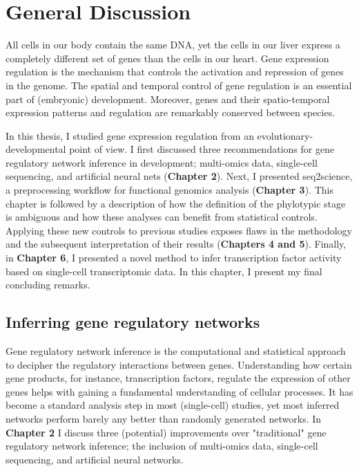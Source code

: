 \chapter{General Discussion}\thumbforchapter
\newpage

\noindent
All cells in our body contain the same DNA, yet the cells in our liver express a completely different set of genes than the cells in our heart. Gene expression regulation is the mechanism that controls the activation and repression of genes in the genome. The spatial and temporal control of gene regulation is an essential part of (embryonic) development. Moreover, genes and their spatio-temporal expression patterns and regulation are remarkably conserved between species.

In this thesis, I studied gene expression regulation from an evolutionary-developmental point of view. I first discussed three recommendations for gene regulatory network inference in development; multi-omics data, single-cell sequencing, and artificial neural nets (\textbf{Chapter 2}). Next, I presented seq2science, a preprocessing workflow for functional genomics analysis (\textbf{Chapter 3}). This chapter is followed by a description of how the definition of the phylotypic stage is ambiguous and how these analyses can benefit from statistical controls. Applying these new controls to previous studies exposes flaws in the methodology and the subsequent interpretation of their results (\textbf{Chapters 4 and 5}). Finally, in \textbf{Chapter 6}, I presented a novel method to infer transcription factor activity based on single-cell transcriptomic data. In this chapter, I present my final concluding remarks.

\section{Inferring gene regulatory networks}

Gene regulatory network inference is the computational and statistical approach to decipher the regulatory interactions between genes. Understanding how certain gene products, for instance, transcription factors, regulate the expression of other genes helps with gaining a fundamental understanding of cellular processes. It has become a standard analysis step in most (single-cell) studies, yet most inferred networks perform barely any better than randomly generated networks\cite{McCalla_2021,Chen_2018,Pratapa_2020}. In \textbf{Chapter 2} I discuss three (potential) improvements over "traditional" gene regulatory network inference; the inclusion of multi-omics data, single-cell sequencing, and artificial neural networks.


